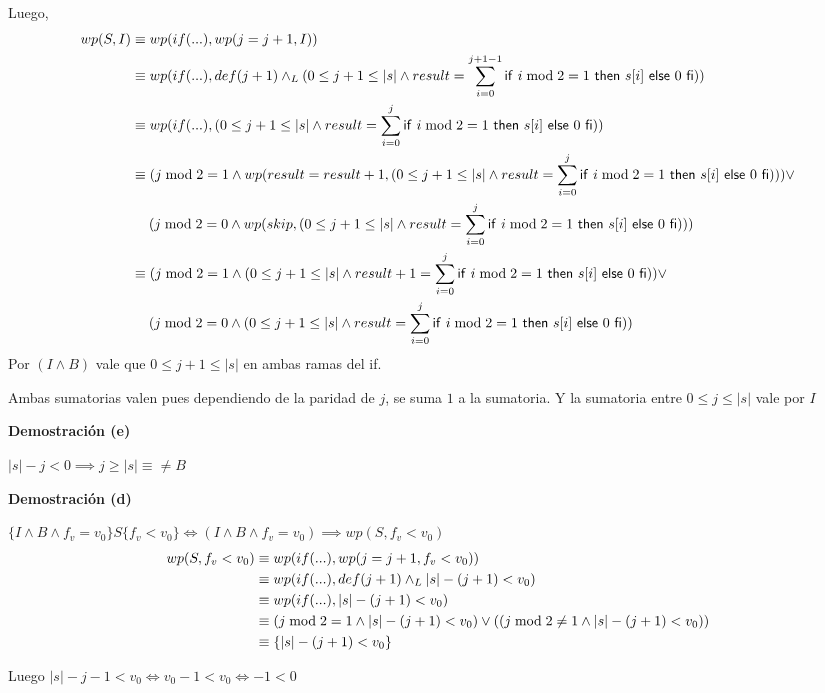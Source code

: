 Luego,
\begin{align*}
    wp(S, I) &\equiv wp(if(...), wp(j = j+1, I)) \\
    &\equiv wp(if(...), def(j+1) \land _L (0 \leq j+1 \leq |s| \wedge result = \sum_{i=0}^{j+1-1}\mathsf{if}\ i \bmod 2 = 1\ \mathsf{then}\ s[i]\ \mathsf{else}\ 0\ \mathsf{fi})) \\
    &\equiv wp(if(...), (0 \leq j+1 \leq |s| \wedge result = \sum_{i=0}^{j}\mathsf{if}\ i \bmod 2 = 1\ \mathsf{then}\ s[i]\ \mathsf{else}\ 0\ \mathsf{fi})) \\
    &\equiv (j \bmod 2 = 1 \wedge wp(result = result +1,(0 \leq j+1 \leq |s| \wedge result = \sum_{i=0}^{j}\mathsf{if}\ i \bmod 2 = 1\ \mathsf{then}\ s[i]\ \mathsf{else}\ 0\ \mathsf{fi}))) \vee \\
    &\quad \; (j \bmod 2 = 0 \wedge wp(skip,(0 \leq j+1 \leq |s| \wedge result = \sum_{i=0}^{j}\mathsf{if}\ i \bmod 2 = 1\ \mathsf{then}\ s[i]\ \mathsf{else}\ 0\ \mathsf{fi}))) \\
    &\equiv (j \bmod 2 = 1 \wedge (0 \leq j+1 \leq |s| \wedge result+1 = \sum_{i=0}^{j}\mathsf{if}\ i \bmod 2 = 1\ \mathsf{then}\ s[i]\ \mathsf{else}\ 0\ \mathsf{fi})) \vee \\
    &\quad \; (j \bmod 2 = 0 \wedge (0 \leq j+1 \leq |s| \wedge result = \sum_{i=0}^{j}\mathsf{if}\ i \bmod 2 = 1\ \mathsf{then}\ s[i]\ \mathsf{else}\ 0\ \mathsf{fi})) \\
\end{align*}
Por $ (I \wedge B) $ vale que $ 0 \leq j+1 \leq |s| $ en ambas ramas del if.

Ambas sumatorias valen pues dependiendo de la paridad de $j$, se suma $1$ a la sumatoria. Y la sumatoria entre $ 0 \leq j \leq |s| $ vale por $I$

\textbf{Demostración (e)}

$ |s| - j < 0 \implies j \geq |s| \equiv \neq B $

\textbf{Demostración (d)}

$ \{ I \wedge B \wedge f_v = v_0 \} S \{ f_v < v_0 \} \iff (I \wedge B \wedge f_v = v_0) \implies wp(S, f_v < v_0) $
\begin{align*}
    wp(S, f_v < v_0) &\equiv wp(if(...), wp(j = j+1, f_v < v_0)) \\
    &\equiv wp(if(...), def(j+1) \land _L |s| - (j+1) < v_0) \\
    &\equiv wp(if(...), |s| - (j+1) < v_0) \\
    &\equiv (j \bmod 2 = 1 \wedge |s| - (j+1) < v_0) \vee ((j \bmod 2 \neq 1 \wedge |s| - (j+1) < v_0)) \\
    &\equiv \{ |s| - (j+1) < v_0 \} \\
\end{align*}

Luego $ |s| - j - 1 < v_0 \iff v_0 -1 < v_0 \iff -1 < 0 $

